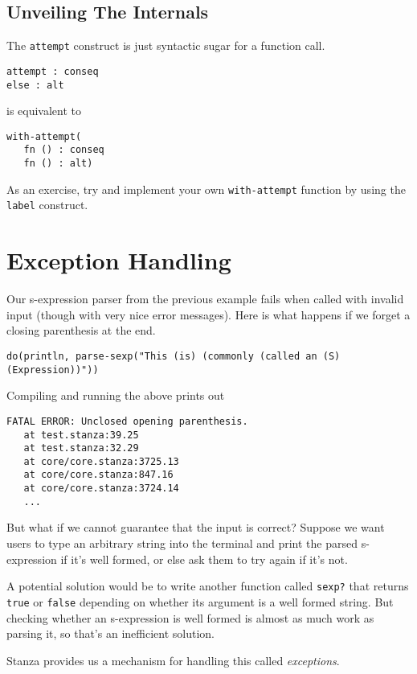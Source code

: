 \documentclass[10pt,oneside]{book}
\begin{document}
\subsection*{Unveiling The Internals}
The \texttt{\frenchspacing attempt} construct is just syntactic sugar for a function call.
\begin{lstlisting}
attempt : conseq
else : alt
\end{lstlisting}
is equivalent to
\begin{lstlisting}
with-attempt(
   fn () : conseq
   fn () : alt)
\end{lstlisting}

As an exercise, try and implement your own \texttt{\frenchspacing with-attempt} function by using the \texttt{\frenchspacing label} construct.

\section{Exception Handling}
Our s-expression parser from the previous example fails when called with invalid input (though with very nice error messages). Here is what happens if we forget a closing parenthesis at the end.
\begin{lstlisting}
do(println, parse-sexp("This (is) (commonly (called an (S) (Expression))"))
\end{lstlisting}
Compiling and running the above prints out
\begin{lstlisting}
FATAL ERROR: Unclosed opening parenthesis.
   at test.stanza:39.25
   at test.stanza:32.29
   at core/core.stanza:3725.13
   at core/core.stanza:847.16
   at core/core.stanza:3724.14
   ...
\end{lstlisting}

But what if we cannot guarantee that the input is correct? Suppose we want users to type an arbitrary string into the terminal and print the parsed s-expression if it's well formed, or else ask them to try again if it's not.

A potential solution would be to write another function called \texttt{\frenchspacing sexp?} that returns \texttt{\frenchspacing true} or \texttt{\frenchspacing false} depending on whether its argument is a well formed string. But checking whether an s-expression is well formed is almost as much work as parsing it, so that's an inefficient solution.

Stanza provides us a mechanism for handling this called {\em exceptions}.
\end{document}
